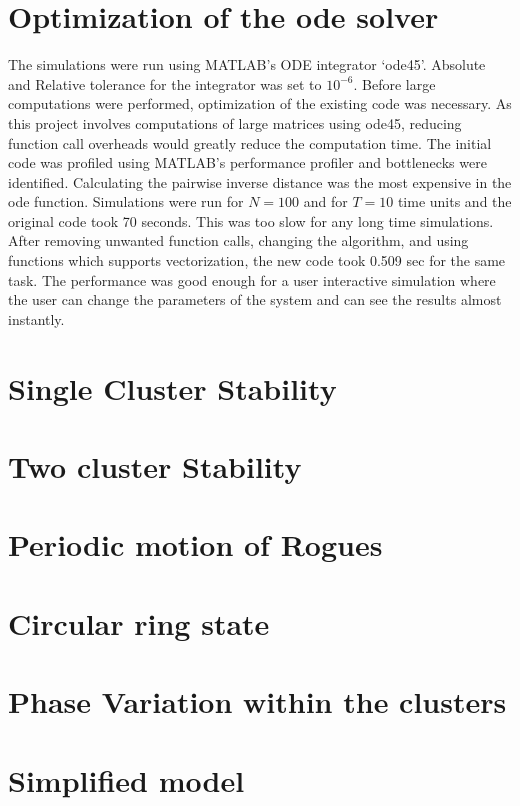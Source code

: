 \documentclass[twocolumn,10pt]{asme2ej}
\begin{document}
\section{Optimization of the ode solver}
The simulations were run using MATLAB's ODE integrator `ode45'. Absolute and Relative tolerance for the integrator was set to $10^{-6}$. Before large computations were performed, optimization of the existing code was necessary. As this project involves computations of large matrices using ode45, reducing function call overheads would greatly reduce the computation time. The initial code was profiled using MATLAB's performance profiler and bottlenecks were identified. Calculating the pairwise inverse distance was the most expensive in the ode function. Simulations were run for $N = 100$ and for $T=10$ time units and the original code took 70 seconds. This was too slow for any long time simulations. After removing unwanted function calls, changing the algorithm, and using functions which supports vectorization, the new code took 0.509 sec for the same task. The performance was good enough for a user interactive simulation where the user can change the parameters of the system and can see the results almost instantly. 
\section{Single Cluster Stability}


\noindent
\section{Two cluster Stability}
\noindent
\section{Periodic motion of Rogues}

\section{Circular ring state}

\section{Phase Variation within the clusters}

\noindent

\section{Simplified model}
\end{document}
